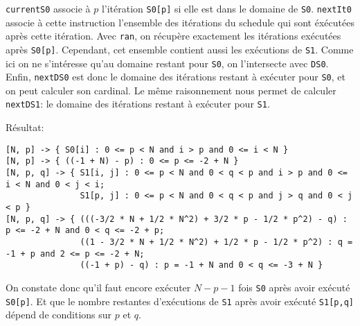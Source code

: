 \documentclass{article}
\begin{document}
\lstinline{currentS0} associe à $p$ l'itération \lstinline{S0[p]} si elle est dans le domaine de \lstinline{S0}.
\lstinline{nextIt0} associe à cette instruction l'ensemble des itérations du schedule qui sont éxécutées après cette itération. Avec \lstinline{ran}, on récupère exactement les itérations exécutées après \lstinline{S0[p]}.
Cependant, cet ensemble contient aussi les exécutions de \lstinline{S1}. Comme ici on ne s'intéresse qu'au domaine restant pour \lstinline{S0}, on l'intersecte avec \lstinline{DS0}.
Enfin, \lstinline{nextDS0} est donc le domaine des itérations restant à exécuter pour \lstinline{S0}, et on peut calculer son cardinal.
Le même raisonnement nous permet de calculer \lstinline{nextDS1}: le domaine des itérations restant à exécuter pour \lstinline{S1}.

Résultat:
\begin{lstlisting}
[N, p] -> { S0[i] : 0 <= p < N and i > p and 0 <= i < N }
[N, p] -> { ((-1 + N) - p) : 0 <= p <= -2 + N }
[N, p, q] -> { S1[i, j] : 0 <= p < N and 0 < q < p and i > p and 0 <= i < N and 0 < j < i;
               S1[p, j] : 0 <= p < N and 0 < q < p and j > q and 0 < j < p }
[N, p, q] -> { (((-3/2 * N + 1/2 * N^2) + 3/2 * p - 1/2 * p^2) - q) : p <= -2 + N and 0 < q <= -2 + p;
               ((1 - 3/2 * N + 1/2 * N^2) + 1/2 * p - 1/2 * p^2) : q = -1 + p and 2 <= p <= -2 + N;
               ((-1 + p) - q) : p = -1 + N and 0 < q <= -3 + N }
\end{lstlisting}

On constate donc qu'il faut encore exécuter $N-p-1$ fois \lstinline{S0} après avoir exécuté \lstinline{S0[p]}.
Et que le nombre restantes d'exécutions de \lstinline{S1} après avoir exécuté \lstinline{S1[p,q]} dépend de conditions sur $p$ et $q$.
\end{document}
